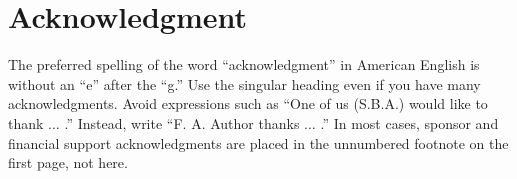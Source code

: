 \documentclass[journal,twoside,web]{ieeecolor}
\begin{document}
\section*{Acknowledgment}
The preferred spelling of the word ``acknowledgment'' in American English is 
without an ``e'' after the ``g.'' Use the singular heading even if you have 
many acknowledgments. Avoid expressions such as ``One of us (S.B.A.) would 
like to thank $\ldots$ .'' Instead, write ``F. A. Author thanks $\ldots$ .'' In most 
cases, sponsor and financial support acknowledgments are placed in the 
unnumbered footnote on the first page, not here.




\end{document}
